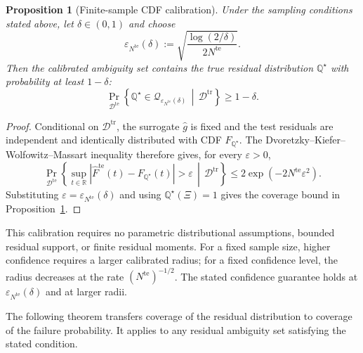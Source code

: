 \documentclass[review,11pt,3p,authoryear,nopreprintline]{elsarticle}
\newtheorem{proposition}{Proposition}
\begin{document}
\begin{proposition}[Finite-sample CDF calibration]
  \label{proposition-01}
  Under the sampling conditions stated above, let $\delta\in(0,1)$ and choose
  \begin{equation}
    \varepsilon_{N^{\mathrm{te}}}(\delta):=\sqrt{\frac{\log(2/\delta)}{2N^{\mathrm{te}}}}.
    \label{eq-cdf-radius}
  \end{equation}
  Then the calibrated ambiguity set contains the true residual distribution $\mathbb{Q}^{\star}$ with probability at least $1 - \delta$:
  \begin{equation}
    \Pr_{\mathcal D^{\mathrm{te}}}\left\{\mathbb Q^\star\in\mathscr Q_{\varepsilon_{N^{\mathrm{te}}}(\delta)}\,\middle|\,\mathcal D^{\mathrm{tr}}\right\}\ge1-\delta.
    \label{eq-cdf-coverage}
  \end{equation}
\end{proposition}
\begin{proof}
  Conditional on $\mathcal D^{\mathrm{tr}}$, the surrogate $\hat g$ is fixed and the test residuals are independent and identically distributed with CDF $F_{\mathbb Q^\star}$. The Dvoretzky--Kiefer--Wolfowitz--Massart inequality therefore gives, for every $\varepsilon>0$,
  \[
    \Pr_{\mathcal D^{\mathrm{te}}}\left\{\sup_{t\in\mathbb R}\left|\widehat F^{\mathrm{te}}(t)-F_{\mathbb Q^\star}(t)\right|>\varepsilon\,\middle|\,\mathcal D^{\mathrm{tr}}\right\}\le2\exp(-2N^{\mathrm{te}}\varepsilon^2).
  \]
  Substituting $\varepsilon=\varepsilon_{N^{\mathrm{te}}}(\delta)$ and using $\mathbb Q^\star(\Xi)=1$ gives the coverage bound in Proposition~\ref{proposition-01}.
\end{proof}

This calibration requires no parametric distributional assumptions, bounded residual support, or finite residual moments. For a fixed sample size, higher confidence requires a larger calibrated radius; for a fixed confidence level, the radius decreases at the rate $(N^{\mathrm{te}})^{-1/2}$. The stated confidence guarantee holds at $\varepsilon_{N^{\mathrm{te}}}(\delta)$ and at larger radii.

The following theorem transfers coverage of the residual distribution to coverage of the failure probability. It applies to any residual ambiguity set satisfying the stated condition.
\end{document}
